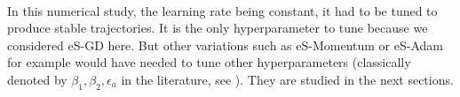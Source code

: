 \documentclass[article,authoryear,jmlmc]{beg_32}             %
\begin{document}



\ \\
In this numerical study, the learning rate being constant, it had to be tuned to produce stable trajectories. 
It is the only hyperparameter to tune because we considered eS-GD here. 
But other variations such as eS-Momentum or eS-Adam for example would have needed to tune other hyperparameters (classically denoted by $\beta_1,\beta_2, \epsilon_a$ in the literature, see
\cite{Bilel_thesis}). They are studied in the next sections. %
\end{document}
